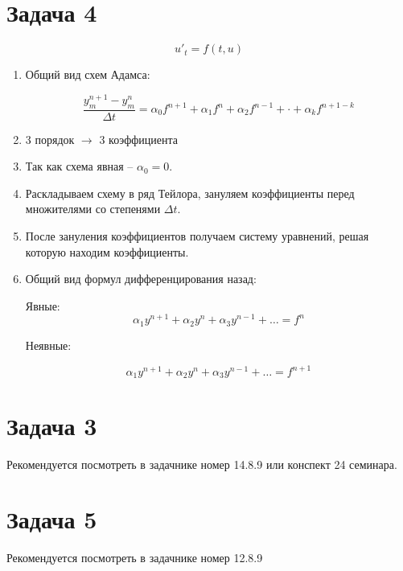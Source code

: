 \documentclass[10pt,a4paper]{article}
\begin{document}
		\section{Задача 4}
		
		\begin{equation}
			u'_{t} = f\left(t, u\right)
		\end{equation}
		
		\begin{enumerate}
			\item
			Общий вид схем Адамса:
			
			\begin{equation}
				\frac{y^{n + 1}_{m} - y^{n}_{m}}{\Delta t} = \alpha_{0}f^{n + 1}
				+ \alpha_{1}f^{n} + \alpha_{2}f^{n - 1} + \cdot + \alpha_{k}
				f^{n + 1 - k}
			\end{equation}
			
			\item 3 порядок $\rightarrow$ 3 коэффициента
			\item Так как схема явная -- $\alpha_{0} = 0$.
			\item Раскладываем схему в ряд Тейлора, зануляем коэффициенты перед
			множителями со степенями $\Delta t$.
			\item После зануления коэффициентов получаем систему уравнений, 
			решая которую находим коэффициенты.
			\item Общий вид формул дифференцирования назад:
		
			Явные:
				\begin{equation}
					\alpha_{1}y^{n + 1} + \alpha_{2}y^{n} + \alpha_{3}y^{n - 1} 
					+ \ldots = f^{n}
				\end{equation}
				
			Неявные:
				
				\begin{equation}
					\alpha_{1}y^{n + 1} + \alpha_{2}y^{n} + \alpha_{3}y^{n - 1} 
					+ \ldots = f^{n + 1}
				\end{equation}
		\end{enumerate}
		\section{Задача 3}
		Рекомендуется посмотреть в задачнике номер 14.8.9 или конспект 24 
		семинара.
		\section{Задача 5}
		Рекомендуется посмотреть в задачнике номер 12.8.9
\end{document}
